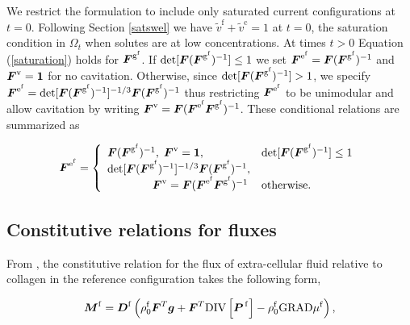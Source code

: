 We restrict the formulation to include only saturated current
configurations at $t = 0$. Following Section \ref{satswel} we have
$\tilde{v}^\mathrm{f} + \tilde{v}^\mathrm{c} = 1$ at $t = 0$, the saturation
condition in $\Omega_t$ when solutes are at low
concentrations. At times $t > 0$ Equation (\ref{saturation}) holds for
$\mbox{\boldmath$ F$}^{\mathrm{g}^\mathrm{f}}$. If
$\mathrm{det}[\mbox{\boldmath$ F$}(\mbox{\boldmath$ F$}^{\mathrm{g}^\mathrm{f}})^{-1}] \le 1$ we set
$\mbox{\boldmath$ F$}^{\mathrm{e}^\mathrm{f}} = \mbox{\boldmath$ F$}(\mbox{\boldmath$ F$}^{\mathrm{g}^\mathrm{f}})^{-1}$
and $\mbox{\boldmath$ F$}^{\mathrm{v}} = {\bf 1}$ for no cavitation. Otherwise, since
$\mathrm{det}[\mbox{\boldmath$ F$}(\mbox{\boldmath$ F$}^{\mathrm{g}^\mathrm{f}})^{-1}] > 1$, we specify
$\mbox{\boldmath$ F$}^{\mathrm{e}^\mathrm{f}} =
\mathrm{det}[\mbox{\boldmath$ F$}(\mbox{\boldmath$ F$}^{\mathrm{g}^\mathrm{f}})^{-1}]^{-1/3}\mbox{\boldmath$ F$}(\mbox{\boldmath$ F$}^{\mathrm{g}^\mathrm{f}})^{-1}$
thus restricting
$\mbox{\boldmath$ F$}^{\mathrm{e}^\mathrm{f}}$ to be unimodular and allow cavitation by
writing $\mbox{\boldmath$ F$}^{\mathrm{v}} = \mbox{\boldmath$ F$}(\mbox{\boldmath$ F$}^{\mathrm{e}^\mathrm{f}}\mbox{\boldmath$ F$}^{\mathrm{g}^\mathrm{f}})^{-1}$.
These conditional relations are summarized as 

\begin{equation}
\mbox{\boldmath$ F$}^{\mathrm{e}^\mathrm{f}} = \left\{ \begin{array}{ll}
  \mbox{\boldmath$ F$}(\mbox{\boldmath$ F$}^{\mathrm{g}^\mathrm{f}})^{-1},\; \mbox{\boldmath$ F$}^{\mathrm{v}} = {\bf 1},&
 \mathrm{det}[\mbox{\boldmath$ F$}(\mbox{\boldmath$ F$}^{\mathrm{g}^\mathrm{f}})^{-1}] \le 1\\
  \mathrm{det}[\mbox{\boldmath$ F$}(\mbox{\boldmath$ F$}^{\mathrm{g}^\mathrm{f}})^{-1}]^{-1/3}\mbox{\boldmath$ F$}(\mbox{\boldmath$ F$}^{\mathrm{g}^\mathrm{f}})^{-1},
  & \\
  \qquad\qquad \mbox{\boldmath$ F$}^{\mathrm{v}} = \mbox{\boldmath$ F$}(\mbox{\boldmath$ F$}^{\mathrm{e}^\mathrm{f}}\mbox{\boldmath$ F$}^{\mathrm{g}^\mathrm{f}})^{-1}
  & \mathrm{otherwise.}
\end{array}\right.
\label{cavitation}
\end{equation}
 
\subsection{Constitutive relations for fluxes}
\label{flux const}

From \citet{growthpaper}, the constitutive relation for the flux of 
extra-cellular fluid relative to collagen in the reference
configuration takes the following form,

\begin{equation}
\mbox{\boldmath$ M$}^\mathrm{f} = \mbox{\boldmath$ D$}^\mathrm{f}\left(\rho_0^\mathrm{f}\mbox{\boldmath$ F$}^T\mbox{\boldmath$ g$} +
      \mbox{\boldmath$ F$}^T\mathrm{\small{DIV}}\left[\mbox{\boldmath$ P$}^{\,\mathrm{f}}\right] -
      \rho_0^\mathrm{f}\mathrm{\small{GRAD}}\mu^\mathrm{f}\right),
\label{fluidflux}
\end{equation}

